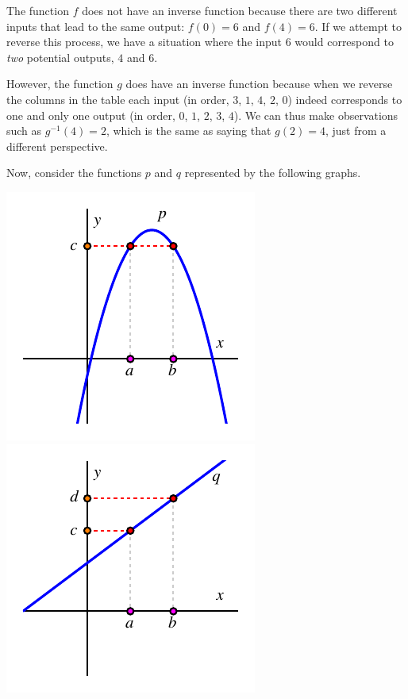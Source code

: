 \documentclass[nooutcomes]{ximera}
\begin{document}
The function $f$ does not have an inverse function because there are two different inputs that lead to the same output:  $f(0) = 6$ and $f(4) = 6$.  If we attempt to reverse this process, we have a situation where the input $6$ would correspond to \emph{two} potential outputs, $4$ and $6$.

However, the function $g$ does have an inverse function because when we reverse the columns in the table each input (in order, $3$, $1$, $4$, $2$, $0$) indeed corresponds to one and only one output (in order, $0$, $1$, $2$, $3$, $4$).  We can thus make observations such as $g^{-1}(4) = 2$, which is the same as saying that $g(2) = 4$, just from a different perspective.

Now, consider the functions  $p$ and $q$ represented by the following graphs.

\begin{image}
\includegraphics{inverse-does-it-1.pdf}
\includegraphics{inverse-does-it-2.pdf}
\end{image}
\end{document}
